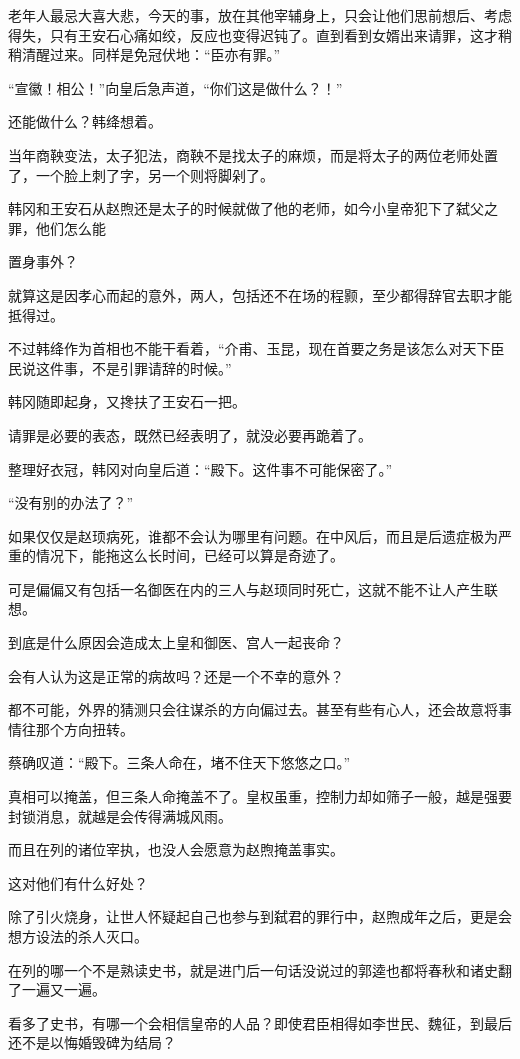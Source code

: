 老年人最忌大喜大悲，今天的事，放在其他宰辅身上，只会让他们思前想后、考虑得失，只有王安石心痛如绞，反应也变得迟钝了。直到看到女婿出来请罪，这才稍稍清醒过来。同样是免冠伏地：“臣亦有罪。”

“宣徽！相公！”向皇后急声道，“你们这是做什么？！”

还能做什么？韩绛想着。

当年商鞅变法，太子犯法，商鞅不是找太子的麻烦，而是将太子的两位老师处置了，一个脸上刺了字，另一个则将脚剁了。

韩冈和王安石从赵煦还是太子的时候就做了他的老师，如今小皇帝犯下了弑父之罪，他们怎么能

置身事外？

就算这是因孝心而起的意外，两人，包括还不在场的程颢，至少都得辞官去职才能抵得过。

不过韩绛作为首相也不能干看着，“介甫、玉昆，现在首要之务是该怎么对天下臣民说这件事，不是引罪请辞的时候。”

韩冈随即起身，又搀扶了王安石一把。

请罪是必要的表态，既然已经表明了，就没必要再跪着了。

整理好衣冠，韩冈对向皇后道：“殿下。这件事不可能保密了。”

“没有别的办法了？”

如果仅仅是赵顼病死，谁都不会认为哪里有问题。在中风后，而且是后遗症极为严重的情况下，能拖这么长时间，已经可以算是奇迹了。

可是偏偏又有包括一名御医在内的三人与赵顼同时死亡，这就不能不让人产生联想。

到底是什么原因会造成太上皇和御医、宫人一起丧命？

会有人认为这是正常的病故吗？还是一个不幸的意外？

都不可能，外界的猜测只会往谋杀的方向偏过去。甚至有些有心人，还会故意将事情往那个方向扭转。

蔡确叹道：“殿下。三条人命在，堵不住天下悠悠之口。”

真相可以掩盖，但三条人命掩盖不了。皇权虽重，控制力却如筛子一般，越是强要封锁消息，就越是会传得满城风雨。

而且在列的诸位宰执，也没人会愿意为赵煦掩盖事实。

这对他们有什么好处？

除了引火烧身，让世人怀疑起自己也参与到弑君的罪行中，赵煦成年之后，更是会想方设法的杀人灭口。

在列的哪一个不是熟读史书，就是进门后一句话没说过的郭逵也都将春秋和诸史翻了一遍又一遍。

看多了史书，有哪一个会相信皇帝的人品？即使君臣相得如李世民、魏征，到最后还不是以悔婚毁碑为结局？

